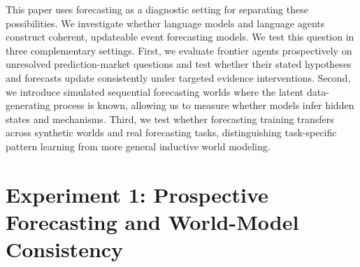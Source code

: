 \documentclass{article}
\begin{document}
This paper uses forecasting as a diagnostic setting for separating these possibilities. We investigate whether language models and language agents construct coherent, updateable event forecasting models. We test this question in three complementary settings. First, we evaluate frontier agents prospectively on unresolved prediction-market questions and test whether their stated hypotheses and forecasts update consistently under targeted evidence interventions. Second, we introduce simulated sequential forecasting worlds where the latent data-generating process is known, allowing us to measure whether models infer hidden states and mechanisms. Third, we test whether forecasting training transfers across synthetic worlds and real forecasting tasks, distinguishing task-specific pattern learning from more general inductive world modeling.

\newpage
\section{Experiment 1: Prospective Forecasting and World-Model Consistency}
\end{document}
